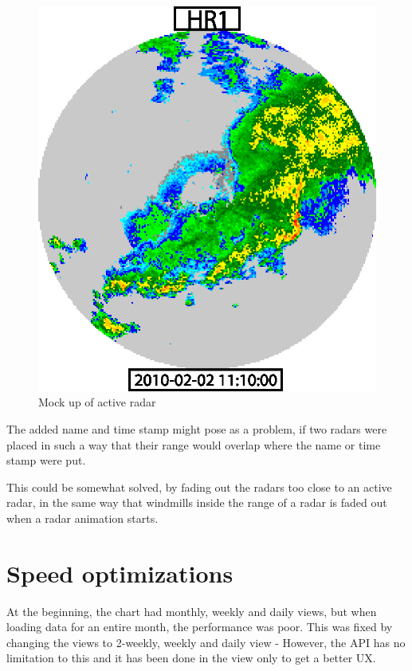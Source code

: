 \begin{figure}[htbp]
\begin{minipage}[b]{0.5\linewidth}
    \centering
    \includegraphics[width=\linewidth]{figure/radar2.eps}
    \caption{Mock up of active radar}
    \label{fig:mock_up_active_radar}
  \end{minipage}
\end{figure}
The added name and time stamp might pose as a problem, if two radars were placed in such a way that their range would overlap where the name or time stamp were put.

This could be somewhat solved, by fading out the radars too close to an active radar, in the same way that windmills inside the range of a radar is faded out when a radar animation starts.

\section{Speed optimizations}

At the beginning, the chart had monthly, weekly and daily views, but when loading data for an entire month, the performance was poor. This was fixed by changing the views to 2-weekly, weekly and daily view - However, the API has no limitation to this and it has been done in the \textsf{view} only to get a better UX.

